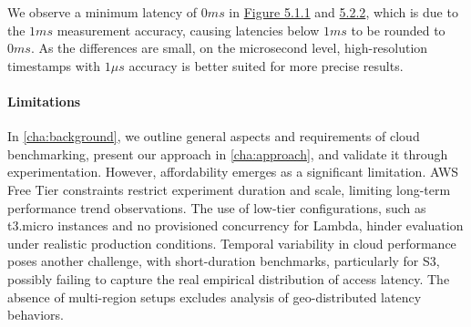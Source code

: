 We observe a minimum latency of $0ms$ in \hyperref[fig:bar_rds_const]{Figure 5.1.1} and \hyperref[fig:bar_rds_bursty]{5.2.2}, which is due to the $1ms$ measurement accuracy, causing latencies below $1ms$ to be rounded to $0ms$. As the differences are small, on the microsecond level, high-resolution timestamps with $1\mu s$ accuracy is better suited for more precise results.

\paragraph*{Limitations} In \cref{cha:background}, we outline general aspects and requirements of cloud benchmarking, present our approach in \cref{cha:approach}, and validate it through experimentation. However, affordability emerges as a significant limitation. AWS Free Tier constraints restrict experiment duration and scale, limiting long-term performance trend observations. The use of low-tier configurations, such as t3.micro instances and no provisioned concurrency for Lambda, hinder evaluation under realistic production conditions. Temporal variability in cloud performance poses another challenge, with short-duration benchmarks, particularly for S3, possibly failing to capture the real empirical distribution of access latency. The absence of multi-region setups excludes analysis of geo-distributed latency behaviors.

